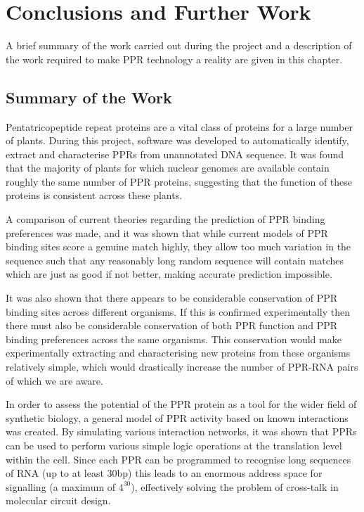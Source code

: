 
\chapter{Conclusions and Further Work}
\label{chap:Conclusions} 

\lettrine{A}{} brief summary of the work carried out during the project and a 
description of the work required to make PPR technology a reality are given in 
this chapter.

\section{Summary of the Work}

Pentatricopeptide repeat proteins are a vital class of proteins for a large
number of plants.
During this project, software was developed to automatically identify, extract 
and characterise PPRs from unannotated DNA sequence.
It was found that the majority of plants for which nuclear genomes are 
available contain roughly the same number of PPR proteins, suggesting that the
function of these proteins is consistent across these plants.

A comparison of current theories regarding the prediction of PPR binding
preferences was made, and it was shown that while current models of PPR binding
sites score a genuine match highly, they allow too much variation in the
sequence such that any reasonably long random sequence will contain matches 
which are just as good if not better, making accurate prediction impossible.

It was also shown that there appears to be considerable conservation of PPR 
binding sites across different organisms.
If this is confirmed experimentally then there must also be considerable 
conservation of both PPR function and PPR binding preferences across the same 
organisms.
This conservation would make experimentally extracting and characterising new
proteins from these organisms relatively simple, which would drastically 
increase the number of PPR-RNA pairs of which we are aware.

In order to assess the potential of the PPR protein as a tool for the wider
field of synthetic biology, a general model of PPR activity based on known 
interactions was created.
By simulating various interaction networks, it was shown that PPRs can be 
used to perform various simple logic operations at the translation level within
the cell.
Since each PPR can be programmed to recognise long sequences of RNA (up to at
least $30$bp) this leads to an enormous address space for signalling (a maximum
of $4^{30}$), effectively solving the problem of cross-talk in molecular 
circuit design.

